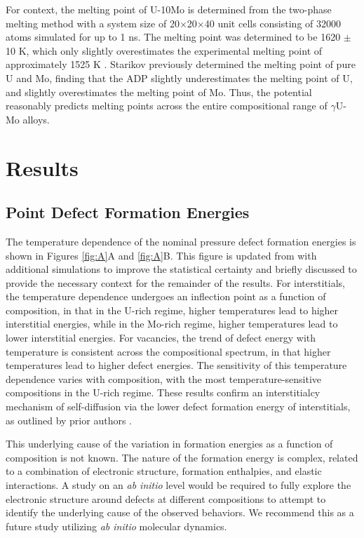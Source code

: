 \documentclass[review]{elsarticle}
\begin{document}
For context, the melting point of U-10Mo is determined from the two-phase melting method \cite{melting1,melting2} with a system size of 20$\times$20$\times$40 unit cells consisting of 32000 atoms simulated for up to 1 ns. The melting point was determined to be 1620 $\pm$ 10 K, which only slightly overestimates the experimental melting point of approximately 1525 K \cite{u-mo_phase_diagram}. Starikov \cite{starikov2018} previously determined the melting point of pure U and Mo, finding that the ADP slightly underestimates the melting point of U, and slightly overestimates the melting point of Mo. Thus, the potential reasonably predicts melting points across the entire compositional range of $\gamma$U-Mo alloys.

\section{Results}\label{sec3}
\subsection{Point Defect Formation Energies}

The temperature dependence of the nominal pressure defect formation energies is shown in Figures \ref{fig:A}A and \ref{fig:A}B. This figure is updated from \cite{beelerMRSadv} with additional simulations to improve the statistical certainty and briefly discussed to provide the necessary context for the remainder of the results. For interstitials, the temperature dependence undergoes an inflection point as a function of composition, in that in the U-rich regime, higher temperatures lead to higher interstitial energies, while in the Mo-rich regime, higher temperatures lead to lower interstitial energies. For vacancies, the trend of defect energy with temperature is consistent across the compositional spectrum, in that higher temperatures lead to higher defect energies. The sensitivity of this temperature dependence varies with composition, with the most temperature-sensitive compositions in the U-rich regime. These results confirm an interstitialcy mechanism of self-diffusion via the lower defect formation energy of interstitials, as outlined by prior authors \cite{park2021,starikov2018}. 

This underlying cause of the variation in formation energies as a function of composition is not known. The nature of the formation energy is complex, related to a combination of electronic structure, formation enthalpies, and elastic interactions. A study on an \textit{ab initio} level would be required to fully explore the electronic structure around defects at different compositions to attempt to identify the underlying cause of the observed behaviors. We recommend this as a future study utilizing \textit{ab initio} molecular dynamics.  
\end{document}

